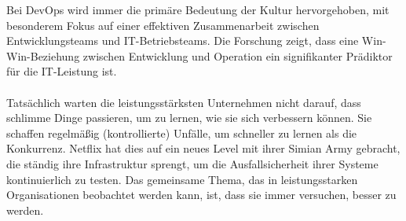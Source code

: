 Bei DevOps wird immer die primäre Bedeutung der Kultur hervorgehoben, mit besonderem Fokus auf einer effektiven Zusammenarbeit zwischen Entwicklungsteams und IT-Betriebsteams. Die Forschung zeigt, dass eine Win-Win-Beziehung zwischen Entwicklung und Operation ein signifikanter Prädiktor für die IT-Leistung ist. \\ \\Tatsächlich warten die leistungsstärksten Unternehmen nicht darauf, dass schlimme Dinge passieren, um zu lernen, wie sie sich verbessern können. Sie schaffen regelmäßig (kontrollierte) Unfälle, um schneller zu lernen als die Konkurrenz. Netflix hat dies auf ein neues Level mit ihrer Simian Army gebracht, die ständig ihre Infrastruktur sprengt, um die Ausfallsicherheit ihrer Systeme kontinuierlich zu testen.
Das gemeinsame Thema, das in leistungsstarken Organisationen beobachtet werden kann, ist, dass sie immer versuchen, besser zu werden. 

